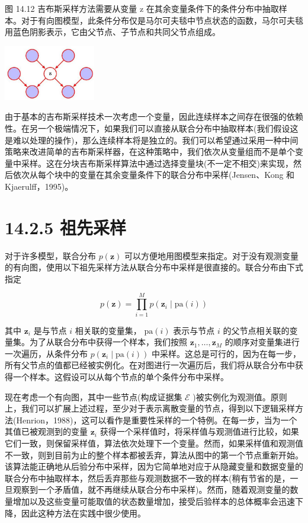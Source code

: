 \documentclass[10pt]{report}
\begin{document}
图 14.12 吉布斯采样方法需要从变量 \(\mathrm{z}\) 在其余变量条件下的条件分布中抽取样本。对于有向图模型，此条件分布仅是马尔可夫毯中节点状态的函数，马尔可夫毯用蓝色阴影表示，它由父节点、子节点和共同父节点组成。

\begin{center}
\includegraphics[max width=0.3\textwidth]{images/0194e279-9b28-703a-88f4-c3ac21e2010d_469_1098_343_455_274_0.jpg}
\end{center}
\hspace*{3em} 

由于基本的吉布斯采样技术一次考虑一个变量，因此连续样本之间存在很强的依赖性。在另一个极端情况下，如果我们可以直接从联合分布中抽取样本(我们假设这是难以处理的操作)，那么连续样本将是独立的。我们可以希望通过采用一种中间策略来改进简单的吉布斯采样器，在这种策略中，我们依次从变量组而不是单个变量中采样。这在分块吉布斯采样算法中通过选择变量块(不一定不相交)来实现，然后依次从每个块中的变量在其余变量条件下的联合分布中采样(Jensen、Kong 和 Kjaerulff，1995)。

\section*{14.2.5 祖先采样}

对于许多模型，联合分布 \(p\left( \mathbf{z}\right)\) 可以方便地用图模型来指定。对于没有观测变量的有向图，使用以下祖先采样方法从联合分布中采样是很直接的。联合分布由下式指定

\[
p\left( \mathbf{z}\right)  = \mathop{\prod }\limits_{{i = 1}}^{M}p\left( {{\mathbf{z}}_{i} \mid  \mathrm{{pa}}\left( i\right) }\right)  \tag{14.47}
\]

其中 \({\mathbf{z}}_{i}\) 是与节点 \(i\) 相关联的变量集， \(\mathrm{{pa}}\left( i\right)\) 表示与节点 \(i\) 的父节点相关联的变量集。为了从联合分布中获得一个样本，我们按照 \({\mathbf{z}}_{1},\ldots ,{\mathbf{z}}_{M}\) 的顺序对变量集进行一次遍历，从条件分布 \(p\left( {{\mathbf{z}}_{i} \mid  \mathrm{{pa}}\left( i\right) }\right)\) 中采样。这总是可行的，因为在每一步，所有父节点的值都已经被实例化。在对图进行一次遍历后，我们将从联合分布中获得一个样本。这假设可以从每个节点的单个条件分布中采样。

现在考虑一个有向图，其中一些节点(构成证据集 \(\mathcal{E}\) )被实例化为观测值。原则上，我们可以扩展上述过程，至少对于表示离散变量的节点，得到以下逻辑采样方法(Henrion，1988)，这可以看作是重要性采样的一个特例。在每一步，当为一个其值已被观测到的变量 \({\mathbf{z}}_{i}\) 获得一个采样值时，将采样值与观测值进行比较，如果它们一致，则保留采样值，算法依次处理下一个变量。然而，如果采样值和观测值不一致，则到目前为止的整个样本都被丢弃，算法从图中的第一个节点重新开始。该算法能正确地从后验分布中采样，因为它简单地对应于从隐藏变量和数据变量的联合分布中抽取样本，然后丢弃那些与观测数据不一致的样本(稍有节省的是，一旦观察到一个矛盾值，就不再继续从联合分布中采样)。然而，随着观测变量的数量增加以及这些变量可能取值的状态数量增加，接受后验样本的总体概率会迅速下降，因此这种方法在实践中很少使用。
\end{document}
